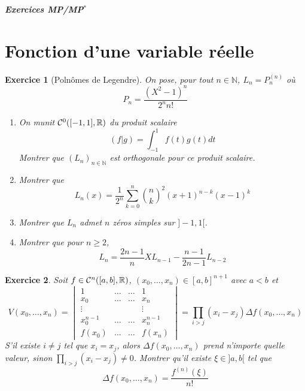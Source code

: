 \documentclass[12pt]{article}
\newtheorem{exercise}{Exercice}[section]
\theoremstyle{remark}
\theoremstyle{remark}
\newcommand{\N}{\mathbb{N}} \newcommand{\Z}{\mathbb{Z}}
\begin{document}
\begin{titlepage}
	\centering
	\vspace*{\fill}
	\Huge \textit{\textbf{Exercices MP/MP$^*$}}
	\vspace*{\fill}
\end{titlepage}

\cleardoublepage

\tableofcontents








\section{Fonction d'une variable réelle}

\begin{exercise}[Polnômes de Legendre]
	On pose, pour tout $n\in\N$, $L_{n}=P_{n}^{(n)}$ où 
	$$P_{n}=\frac{(X^{2}-1)^{n}}{2^{n}n!}$$
	\begin{enumerate}
		\item On munit $\mathcal{C}^{0}([-1,1],\mathbb{R})$ du produit scalaire
		$$(f|g)=\int_{-1}^{1}f(t)g(t)dt$$
		Montrer que $(L_{n})_{n\in\N}$ est orthogonale pour ce produit scalaire.

		\item Montrer que 
		$$L_{n}(x)=\frac{1}{2^{n}}\sum_{k=0}^{n}\binom{n}{k}^{2}(x+1)^{n-k}(x-1)^{k}$$
		
		\item Montrer que $L_{n}$ admet $n$ zéros simples sur $]-1,1[$.
		\item Montrer que pour $n\geqslant2$,
		$$L_{n}=\frac{2n-1}{n}XL_{n-1}-\frac{n-1}{2n-1}L_{n-2}$$
	\end{enumerate}
\end{exercise}

\begin{exercise}
	Soit $f\in\mathcal{C}^{n}([a,b],\mathbb{R})$, $(x_{0},\dots,x_{n})\in[a,b]^{n+1}$ avec $a<b$ et
	$$V(x_{0},\dots,x_{n})
	=
	\begin{vmatrix}
		1 & \dots & \dots & 1\\
		x_{0} & \dots & \dots &x_{n}\\
		\vdots & & &\vdots\\
		x_{0}^{n-1} & \dots &\dots  &x_{n}^{n-1}\\
		f(x_{0}) & \dots  &\dots & f(x_{n})
	\end{vmatrix}
	=\prod_{i>j}(x_{i}-x_{j})\Delta f(x_{0},\dots,x_{n})$$
	S'il existe $i\neq j$ tel que $x_{i}=x_{j}$, alors $\Delta f(x_{0},\dots,x_{n})$ prend n'importe quelle valeur, sinon $\prod_{i>j}(x_{i}-x_{j})\neq0$. Montrer qu'il existe $\xi\in]a,b[$ tel que 
	$$\Delta f(x_{0},\dots,x_{n})=\frac{f^{(n)}(\xi)}{n!}$$
\end{exercise}
\end{document}
